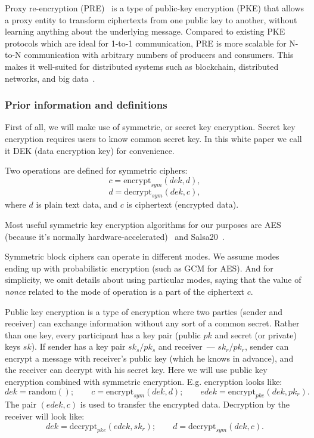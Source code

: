 \documentclass[notitlepage,longbibliography]{revtex4-1}
\begin{document}
Proxy re-encryption (PRE)~\cite{wiki:pre,phd:nunez} is a type of public-key encryption (PKE) that allows a proxy entity to transform ciphertexts
from one public key to another, without learning anything about the underlying message.
Compared to existing PKE protocols which are ideal for 1-to-1 communication, PRE is more scalable for N-to-N communication
with arbitrary numbers of producers and consumers.
This makes it well-suited for distributed systems such as blockchain, distributed networks, and big data~\cite{web:nucypher-hadoop}.

\subsubsection{Prior information and definitions}

First of all, we will make use of symmetric, or secret key encryption.
Secret key encryption requires users to know common secret key.
In this white paper we call it DEK (data encryption key) for convenience.

Two operations are defined for symmetric ciphers:
$$c = \text{encrypt}_{sym}(dek, d),$$
$$d = \text{decrypt}_{sym}(dek, c),$$
where $d$ is plain text data, and $c$ is ciphertext (encrypted data).

Most useful symmetric key encryption algorithms for our purposes are AES (because it's normally hardware-accelerated)~\cite{wiki:aes}
and Salsa20~\cite{wiki:salsa20}.

Symmetric block ciphers can operate in different modes.
We assume modes ending up with probabilistic encryption (such as GCM for AES).
And for simplicity, we omit details about using particular modes, saying that the value of \emph{nonce} related to the mode of operation is a part of the
ciphertext $c$.

Public key encryption is a type of encryption where two parties (sender and receiver) can exchange information without any sort of a common secret.
Rather than one key, every participant has a key pair (public $pk$ and secret (or private) keys $sk$).
If sender has a key pair $sk_s/pk_s$ and receiver~--- $sk_r/pk_r$, sender can encrypt a message with receiver's public key (which he knows in advance),
and the receiver can decrypt with his secret key.
Here we will use public key encryption combined with symmetric encryption.
E.g. encryption looks like:
$$dek = \text{random}();\qquad c = \text{encrypt}_{sym}(dek, d);\qquad edek=\text{encrypt}_{pke}(dek, pk_r).$$
The pair $(edek, c)$ is used to transfer the encrypted data.
Decryption by the receiver will look like:
$$dek=\text{decrypt}_{pke}(edek, sk_r);\qquad d = \text{decrypt}_{sym}(dek, c).$$
\end{document}
